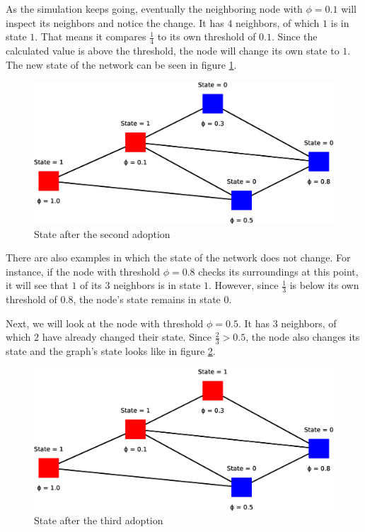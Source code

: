 \documentclass{sig-alternate-05-2015}
\begin{document}
As the simulation keeps going, eventually the neighboring node with $\phi = 0.1$ will inspect its neighbors and notice the change. It has $4$ neighbors, of which $1$ is in state $1$. That means it compares $\frac{1}{4}$ to its own threshold of $0.1$. Since the calculated value is above the threshold, the node will change its own state to $1$. The new state of the network can be seen in figure \ref{fig:model3}.

\begin{figure}[h!]
    \includegraphics[width=\columnwidth]{../presentation/img/model6}
    \centering
    \caption{State after the second adoption}
    \label{fig:model3}
\end{figure}

There are also examples in which the state of the network does not change. For instance, if the node with threshold $\phi = 0.8$ checks its surroundings at this point, it will see that $1$ of its $3$ neighbors is in state $1$. However, since $\frac{1}{3}$ is below its own threshold of $0.8$, the node's state remains in state $0$.

Next, we will look at the node with threshold $\phi = 0.5$. It has $3$ neighbors, of which $2$ have already changed their state. Since $\frac{2}{3} > 0.5$, the node also changes its state and the graph's state looks like in figure \ref{fig:model4}.

\begin{figure}[h!]
    \includegraphics[width=\columnwidth]{../presentation/img/model7}
    \centering
    \caption{State after the third adoption}
    \label{fig:model4}
\end{figure}
\end{document}
